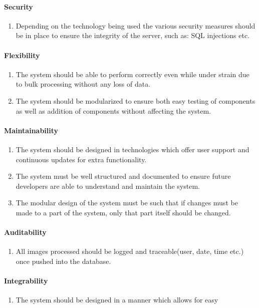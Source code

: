 \documentclass[a4paper,12pt]{report}
\begin{document}
\paragraph{Security}
\begin{enumerate}
	\item Depending on the technology being used the various security measures should be in place to ensure the integrity of the server, such as: SQL injections etc.
\end{enumerate}
\paragraph{Flexibility}
\begin{enumerate}
	\item The system should be able to perform correctly even while under strain due to bulk processing without any loss of data.
	\item The system should be modularized to ensure both easy testing of components as well as addition of components without affecting the system.
\end{enumerate}
\paragraph{Maintainability}
\begin{enumerate}
	\item The system should be designed in technologies which offer user support and continuous updates for extra functionality.
	\item The system must be well structured and documented to ensure future developers are able to understand and maintain the system.
	\item The modular design of the system must be such that if changes must be made to a part of the system, only that part itself should be changed.
\end{enumerate}
\paragraph{Auditability}
\begin{enumerate}
	\item All images processed should be logged and traceable(user, date, time etc.) once pushed into the database.
\end{enumerate}
\paragraph{Integrability}
\begin{enumerate}
	\item The system should be designed in a manner which allows for easy 
\end{enumerate}
\end{document}
